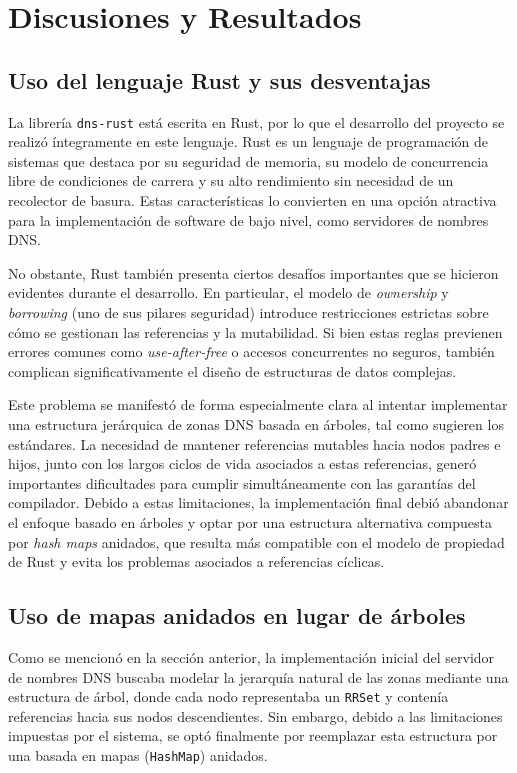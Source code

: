 \chapter{Discusiones y Resultados}

\section{Uso del lenguaje Rust y sus desventajas}

La librería \texttt{dns-rust} está escrita en Rust, por lo que el desarrollo del proyecto se realizó íntegramente en este lenguaje. Rust es un lenguaje de programación de sistemas que destaca por su 
seguridad de memoria, su modelo de concurrencia libre de condiciones de carrera y su alto rendimiento sin necesidad de un recolector de basura. Estas características lo convierten en una opción 
atractiva para la implementación de software de bajo nivel, como servidores de nombres DNS.

No obstante, Rust también presenta ciertos desafíos importantes que se hicieron evidentes durante el desarrollo. En particular, el modelo de \textit{ownership} y \textit{borrowing} (uno de sus pilares 
seguridad) introduce restricciones estrictas sobre cómo se gestionan las referencias y la mutabilidad. Si bien estas reglas previenen errores comunes como \textit{use-after-free} o accesos 
concurrentes no seguros, también complican significativamente el diseño de estructuras de datos complejas.

Este problema se manifestó de forma especialmente clara al intentar implementar una estructura jerárquica de zonas DNS basada en árboles, tal como sugieren los estándares. La necesidad de mantener 
referencias mutables hacia nodos padres e hijos, junto con los largos ciclos de vida asociados a estas referencias, generó importantes dificultades para cumplir simultáneamente con las garantías del 
compilador. Debido a estas limitaciones, la implementación final debió abandonar el enfoque basado en árboles y optar por una estructura alternativa compuesta por \textit{hash maps} anidados, que 
resulta más compatible con el modelo de propiedad de Rust y evita los problemas asociados a referencias cíclicas.

\section{Uso de mapas anidados en lugar de árboles}

Como se mencionó en la sección anterior, la implementación inicial del servidor de nombres DNS buscaba modelar la jerarquía natural de las zonas mediante una estructura de árbol, donde cada nodo 
representaba un \texttt{RRSet} y contenía referencias hacia sus nodos descendientes. Sin embargo, debido a las limitaciones impuestas por el sistema, se optó finalmente por 
reemplazar esta estructura por una basada en mapas (\texttt{HashMap}) anidados.

